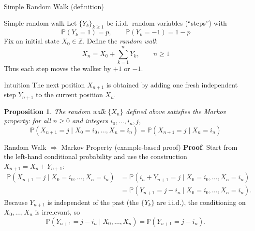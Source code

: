 \documentclass[8pt]{beamer}
\newtheorem{proposition}{Proposition}
\begin{document}
\begin{frame}{Simple Random Walk (definition)}
\begin{block}{Simple random walk}
\vspace{1mm}
Let \(\{Y_k\}_{k\ge 1}\) be i.i.d.\ random variables (``steps'') with
\begin{equation*}
\mathbb{P}(Y_k = 1) = p,\qquad \mathbb{P}(Y_k = -1) = 1-p
\end{equation*}
Fix an initial state \(X_0\in\mathbb{Z}\). Define the \emph{random walk}
\begin{equation*}
X_n = X_0 + \sum_{k=1}^n Y_k,\qquad n\ge1
\end{equation*}
Thus each step moves the walker by \(+1\) or \(-1\).
\end{block}

\begin{exampleblock}{Intuition}
The next position \(X_{n+1}\) is obtained by adding one fresh independent step \(Y_{n+1}\) to the current position \(X_n\).
\end{exampleblock}

\begin{proposition}
The random walk \(\{X_n\}\) defined above satisfies the Markov property:
for all \(n\ge0\) and integers \(i_0,\dots,i_n,j\),
\begin{equation*}
\mathbb{P}(X_{n+1}=j\mid X_0=i_0,\dots,X_n=i_n)
=\mathbb{P}(X_{n+1}=j\mid X_n=i_n)
\end{equation*}
\end{proposition}
\end{frame}

\begin{frame}{Random Walk $\Rightarrow$ Markov Property (example-based proof)}
\textbf{Proof}.
Start from the left-hand conditional probability and use the construction \(X_{n+1}=X_n+Y_{n+1}\):
\begin{equation*}
\begin{aligned}
\mathbb{P}(X_{n+1}=j\mid X_0=i_0,\dots,X_n=i_n)
&= \mathbb{P}(i_n + Y_{n+1} = j \mid X_0=i_0,\dots,X_n=i_n)\\[4pt]
&= \mathbb{P}(Y_{n+1}=j-i_n \mid X_0=i_0,\dots,X_n=i_n).
\end{aligned}
\end{equation*}
Because \(Y_{n+1}\) is independent of the past (the \(\{Y_k\}\) are i.i.d.),
the conditioning on \(X_0,\dots,X_n\) is irrelevant, so
\begin{equation*}
\mathbb{P}(Y_{n+1}=j-i_n \mid X_0,\dots,X_n)
= \mathbb{P}(Y_{n+1}=j-i_n).
\end{equation*}
\end{frame}
\end{document}
